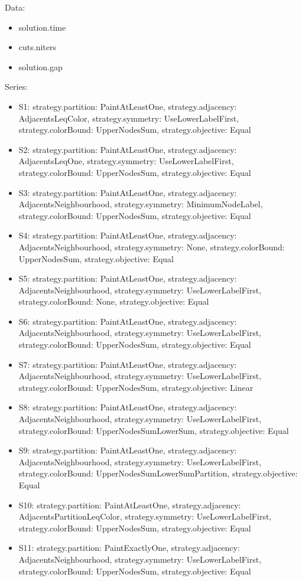 \documentclass[landscape, 12pt]{report}
\begin{document}
\clearpage

Data:
\begin{itemize}
\item solution.time
\item cuts.niters
\item solution.gap
\end{itemize}
Series:
\begin{itemize}
\item S1: strategy.partition: PaintAtLeastOne, strategy.adjacency: AdjacentsLeqColor, strategy.symmetry: UseLowerLabelFirst, strategy.colorBound: UpperNodesSum, strategy.objective: Equal
\item S2: strategy.partition: PaintAtLeastOne, strategy.adjacency: AdjacentsLeqOne, strategy.symmetry: UseLowerLabelFirst, strategy.colorBound: UpperNodesSum, strategy.objective: Equal
\item S3: strategy.partition: PaintAtLeastOne, strategy.adjacency: AdjacentsNeighbourhood, strategy.symmetry: MinimumNodeLabel, strategy.colorBound: UpperNodesSum, strategy.objective: Equal
\item S4: strategy.partition: PaintAtLeastOne, strategy.adjacency: AdjacentsNeighbourhood, strategy.symmetry: None, strategy.colorBound: UpperNodesSum, strategy.objective: Equal
\item S5: strategy.partition: PaintAtLeastOne, strategy.adjacency: AdjacentsNeighbourhood, strategy.symmetry: UseLowerLabelFirst, strategy.colorBound: None, strategy.objective: Equal
\item S6: strategy.partition: PaintAtLeastOne, strategy.adjacency: AdjacentsNeighbourhood, strategy.symmetry: UseLowerLabelFirst, strategy.colorBound: UpperNodesSum, strategy.objective: Equal
\item S7: strategy.partition: PaintAtLeastOne, strategy.adjacency: AdjacentsNeighbourhood, strategy.symmetry: UseLowerLabelFirst, strategy.colorBound: UpperNodesSum, strategy.objective: Linear
\item S8: strategy.partition: PaintAtLeastOne, strategy.adjacency: AdjacentsNeighbourhood, strategy.symmetry: UseLowerLabelFirst, strategy.colorBound: UpperNodesSumLowerSum, strategy.objective: Equal
\item S9: strategy.partition: PaintAtLeastOne, strategy.adjacency: AdjacentsNeighbourhood, strategy.symmetry: UseLowerLabelFirst, strategy.colorBound: UpperNodesSumLowerSumPartition, strategy.objective: Equal
\item S10: strategy.partition: PaintAtLeastOne, strategy.adjacency: AdjacentsPartitionLeqColor, strategy.symmetry: UseLowerLabelFirst, strategy.colorBound: UpperNodesSum, strategy.objective: Equal
\item S11: strategy.partition: PaintExactlyOne, strategy.adjacency: AdjacentsNeighbourhood, strategy.symmetry: UseLowerLabelFirst, strategy.colorBound: UpperNodesSum, strategy.objective: Equal
\end{itemize}
\end{document}
